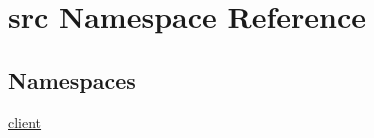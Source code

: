 \hypertarget{namespacesrc}{\section{src Namespace Reference}
\label{namespacesrc}
}
\subsection*{Namespaces}
\begin{DoxyCompactItemize}
\item 
\hyperlink{namespacesrc_1_1client}{client}
\end{DoxyCompactItemize}
